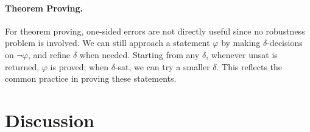 \documentclass[prodmode]{acmsmall} %
\begin{document}
\paragraph{Theorem Proving.} For theorem proving, one-sided errors are not directly useful since no robustness problem is involved. We can still approach a statement $\varphi$ by making $\delta$-decisions on $\neg\varphi$, and refine $\delta$ when needed. Starting from any $\delta$, whenever {\sf unsat} is returned, $\varphi$ is proved; when {\sf $\delta$-sat}, we can try a smaller $\delta$. This reflects the common practice in proving these statements. 

\section{Discussion}
\label{discu}


\end{document}
